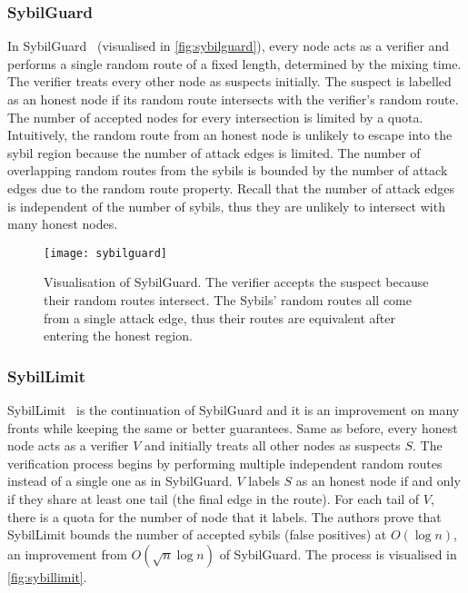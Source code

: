 \subsubsection{SybilGuard}
In SybilGuard~\cite{yu2006sybilguard} (visualised in \autoref{fig:sybilguard}),
every node acts as a verifier and performs a single random route of a fixed
length, determined by the mixing time. The verifier treats every other node as
suspects initially. The suspect is labelled as an honest node if its random
route intersects with the verifier's random route. The number of accepted nodes
for every intersection is limited by a quota. Intuitively, the random route from
an honest node is unlikely to escape into the sybil region because the number of
attack edges is limited. The number of overlapping random routes from the sybils
is bounded by the number of attack edges due to the random route property.
Recall that the number of attack edges is independent of the number of sybils,
thus they are unlikely to intersect with many honest nodes.

\begin{figure}
  \centering
  \texttt{[image: sybilguard]}
  \caption{Visualisation of SybilGuard. The verifier accepts the suspect because
    their random routes intersect. The Sybils' random routes all come from a
    single attack edge, thus their routes are equivalent after entering the
    honest region.}
  \label{fig:sybilguard}
\end{figure}

\subsubsection{SybilLimit}
SybilLimit~\cite{yu2008sybillimit} is the continuation of SybilGuard and it is
an improvement on many fronts while keeping the same or better guarantees. Same
as before, every honest node acts as a verifier $V$ and initially treats all
other nodes as suspects $S$. The verification process begins by performing
multiple independent random routes instead of a single one as in SybilGuard. $V$
labels $S$ as an honest node if and only if they share at least one tail (the
final edge in the route). For each tail of $V$, there is a quota for the number
of node that it labels. The authors prove that SybilLimit bounds the number of
accepted sybils (false positives) at $O(\log{n})$, an improvement from
$O(\sqrt{n} \log{n})$ of SybilGuard. The process is visualised in
\autoref{fig:sybillimit}.

